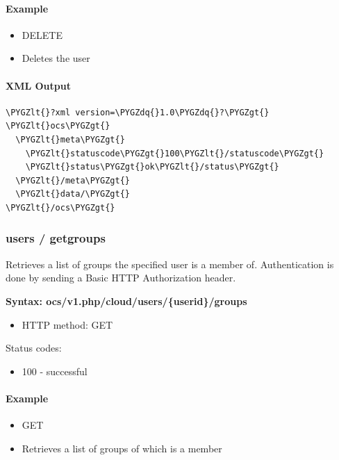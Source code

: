 \documentclass[letterpaper,10pt,english]{sphinxmanual}
\def\PYGZlt{\char`\<}
\def\PYGZgt{\char`\>}
\def\PYGZdq{\char`\"}
\begin{document}
\paragraph{Example}
\label{configuration_user/user_provisioning_api:id6}\begin{itemize}
\item {} 
DELETE 

\item {} 
Deletes the user 

\end{itemize}


\paragraph{XML Output}
\label{configuration_user/user_provisioning_api:id7}
\begin{Verbatim}[commandchars=\\\{\}]
\PYGZlt{}?xml version=\PYGZdq{}1.0\PYGZdq{}?\PYGZgt{}
\PYGZlt{}ocs\PYGZgt{}
  \PYGZlt{}meta\PYGZgt{}
    \PYGZlt{}statuscode\PYGZgt{}100\PYGZlt{}/statuscode\PYGZgt{}
    \PYGZlt{}status\PYGZgt{}ok\PYGZlt{}/status\PYGZgt{}
  \PYGZlt{}/meta\PYGZgt{}
  \PYGZlt{}data/\PYGZgt{}
\PYGZlt{}/ocs\PYGZgt{}
\end{Verbatim}


\subsubsection{\textbf{users / getgroups}}
\label{configuration_user/user_provisioning_api:users-getgroups}
Retrieves a list of groups the specified user is a member of. Authentication is
done by sending a Basic HTTP Authorization header.

\textbf{Syntax: ocs/v1.php/cloud/users/\{userid\}/groups}
\begin{itemize}
\item {} 
HTTP method: GET

\end{itemize}

Status codes:
\begin{itemize}
\item {} 
100 - successful

\end{itemize}


\paragraph{Example}
\label{configuration_user/user_provisioning_api:id8}\begin{itemize}
\item {} 
GET  

\item {} 
Retrieves a list of groups of which  is a member

\end{itemize}
\end{document}
